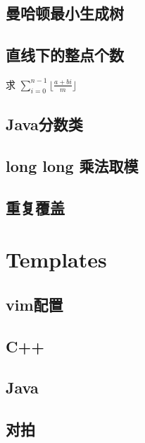 \documentclass[landscape, twocolumn, 8pt, a4paper, twoside]{extarticle}
\begin{document}
  \subsection{曼哈顿最小生成树}
    

  \subsection{直线下的整点个数}
    求 $\sum_{i=0}^{n-1} \lfloor\frac{a+bi}{m}\rfloor$
    

  \subsection{Java分数类}
    

  \subsection{long long 乘法取模}
    

  \subsection{重复覆盖}
    

\section{Templates}
  \subsection{vim配置}
    
  \subsection{C++}
    
  \subsection{Java}
    
  \subsection{对拍}
    
\end{document}
